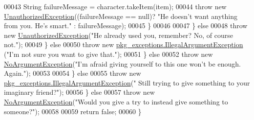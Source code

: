 \begin{DoxyCode}
00043                                 String failureMessage = character.takeItem(item);
00044                                 \textcolor{keywordflow}{throw} \textcolor{keyword}{new} \hyperlink{classpkg__exceptions_1_1UnauthorizedException}{UnauthorizedException}((failureMessage == 
      null)? \textcolor{stringliteral}{"He doesn't want anything from you. He's smart."} : failureMessage);
00045                             \}
00046 
00047                         \} \textcolor{keywordflow}{else}
00048                             \textcolor{keywordflow}{throw} \textcolor{keyword}{new} \hyperlink{classpkg__exceptions_1_1UnauthorizedException}{UnauthorizedException}(\textcolor{stringliteral}{"He already used you,
       remember? No, of course not."});
00049                     \} \textcolor{keywordflow}{else}
00050                         \textcolor{keywordflow}{throw} \textcolor{keyword}{new} \hyperlink{classpkg__exceptions_1_1IllegalArgumentException}{pkg\_exceptions.IllegalArgumentException}
      (\textcolor{stringliteral}{"I'm not sure you want to give that."});
00051                 \} \textcolor{keywordflow}{else}
00052                     \textcolor{keywordflow}{throw} \textcolor{keyword}{new} \hyperlink{classpkg__exceptions_1_1NoArgumentException}{NoArgumentException}(\textcolor{stringliteral}{"I'm afraid giving yourself to this
       one won't be enough. Again."});
00053 
00054             \} \textcolor{keywordflow}{else}
00055                 \textcolor{keywordflow}{throw} \textcolor{keyword}{new} \hyperlink{classpkg__exceptions_1_1IllegalArgumentException}{pkg\_exceptions.IllegalArgumentException}(\textcolor{stringliteral}{"
      Still trying to give something to your imaginary friend?"});
00056         \} \textcolor{keywordflow}{else}
00057             \textcolor{keywordflow}{throw} \textcolor{keyword}{new} \hyperlink{classpkg__exceptions_1_1NoArgumentException}{NoArgumentException}(\textcolor{stringliteral}{"Would you give a try to instead give
       something to someone?"});
00058 
00059         \textcolor{keywordflow}{return} \textcolor{keyword}{false};
00060     \}
\end{DoxyCode}


